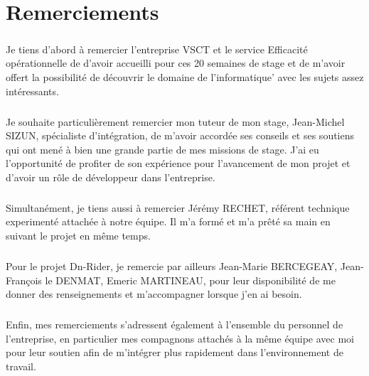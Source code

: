 \chapter*{Remerciements}

\paragraph{} Je tiens d’abord à remercier l’entreprise VSCT et le service Efficacité opérationnelle de d’avoir accueilli pour ces 20 semaines de stage et de m’avoir offert la possibilité de découvrir le
domaine de l'informatique' avec les sujets assez intéressants.
\paragraph{} Je souhaite particulièrement remercier mon tuteur de mon stage, Jean-Michel SIZUN, spécialiste d'intégration, de m’avoir accordée ses conseils et ses soutiens qui
ont mené à bien une grande partie de mes missions de stage. J’ai eu l’opportunité de profiter de
son expérience pour l’avancement de mon projet et d'avoir un rôle de développeur dans l’entreprise.
\paragraph{} Simultanément, je tiens aussi à remercier Jérémy RECHET, référent technique experimenté
attachée à notre équipe. Il m’a formé et m’a prêté sa main en suivant le projet en même temps.
\paragraph{} Pour le projet Dn-Rider, je remercie par ailleurs Jean-Marie BERCEGEAY, Jean-François le DENMAT, Emeric MARTINEAU, pour leur disponibilité de me donner des
renseignements et m’accompagner lorsque j'en ai besoin.
\paragraph{} Enfin, mes remerciements s’adressent également à l’ensemble du personnel de l’entreprise, en
particulier mes compagnons attachés à la même équipe avec moi pour leur soutien afin de
m’intégrer plus rapidement dans l’environnement de travail.

